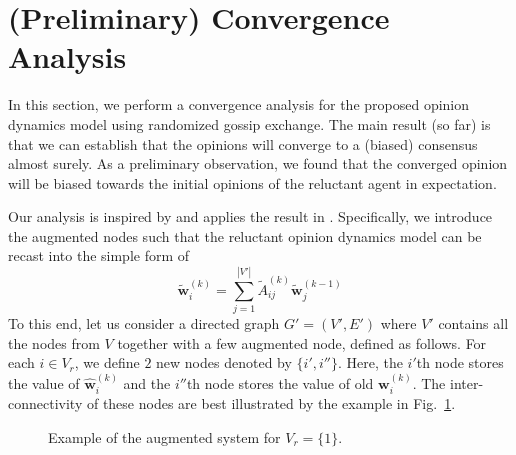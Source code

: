 \documentclass[letter]{article}
\theoremstyle{remark}
\begin{document}
\section{(Preliminary) Convergence Analysis} 
In this section, we perform a convergence analysis for the proposed opinion dynamics model using randomized gossip exchange. 
The main result (so far) is that we can establish that the opinions will  converge to a (biased) consensus almost surely. 
As a preliminary observation, we found that the converged opinion will be biased towards the initial opinions of the reluctant agent in expectation. 

Our analysis is inspired by \cite{} and applies the result in \cite{}. Specifically, we introduce the augmented nodes such that the reluctant opinion dynamics model can be recast into the simple form of 
\[
\tilde{\bm w}_i^{(k)} = \sum_{j=1}^{|V'|} \tilde{A}_{ij}^{(k)} \tilde{\bm w}_j^{(k-1)}
\]
To this end, let us consider a directed graph $G' = (V',E')$ where $V'$ contains all the nodes from $V$ together with a few augmented node, defined as follows. For each $i \in V_r$, we define $2$ new nodes denoted by $\{ i', i'' \}$. Here, the $i'$th node stores the value of $\hat{\bm w}_i^{(k)}$ and the $i''$th node stores the value of old ${\bm w}_i^{(k)}$. The inter-connectivity of these nodes are best illustrated by the example in Fig.~\ref{fig:augment}. 

\begin{figure}[t]
\centerline{
}
\caption{Example of the augmented system for $V_r = \{1\}$. 
} \label{fig:augment}
\end{figure}
\end{document}
